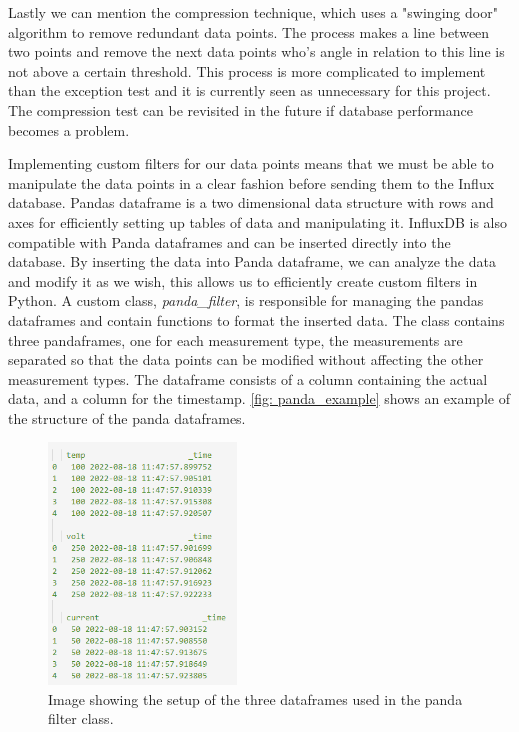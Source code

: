 \documentclass[main.tex]{subfiles}
\begin{document}
 Lastly we can mention the compression technique, which uses a "swinging door" algorithm to remove redundant data points. The process makes a line between two points and remove the next data points who's angle in relation to this line is not above a certain threshold. This process is more complicated to implement than the exception test and it is currently seen as unnecessary for this project. The compression test can be revisited in the future if database performance becomes a problem.
 
 Implementing custom filters for our data points means that we must be able to manipulate the data points in a clear fashion before sending them to the Influx database. Pandas dataframe is a two dimensional data structure with rows and axes for efficiently setting up tables of data and manipulating it. InfluxDB is also compatible with Panda dataframes and can be inserted directly into the database. By inserting the data into Panda dataframe, we can analyze the data and modify it as we wish, this allows us to efficiently create custom filters in Python. A custom class, \textit{panda\_filter}, is responsible for managing the pandas dataframes and contain functions to format the inserted data. The class contains three pandaframes, one for each measurement type, the measurements are separated so that the data points can be modified without affecting the other measurement types. The dataframe consists of a column containing the actual data, and a column for the timestamp. \autoref{fig: panda_example} shows an example of the structure of the panda dataframes. 
 
 \begin{figure}[!htpb]
    \centering
    \includegraphics[width=5cm, scale=1]{images/panda_frame_example.png}
    \caption{Image showing the setup of the three dataframes used in the panda filter class.}
    \label{fig: panda_example}
\end{figure}
\FloatBarrier 
\end{document}
